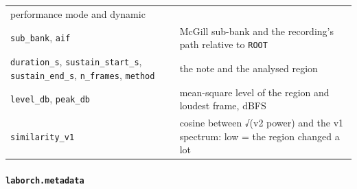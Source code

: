 \documentclass[
  10pt,
]{article}
\begin{document}
\begin{longtable}[]{@{}ll@{}}
\begin{minipage}[t]{0.47\columnwidth}\raggedright
performance mode and dynamic\strut
\end{minipage}\tabularnewline
\begin{minipage}[t]{0.47\columnwidth}\raggedright
\texttt{sub\_bank}, \texttt{aif}\strut
\end{minipage} &
\begin{minipage}[t]{0.47\columnwidth}\raggedright
McGill sub-bank and the recording's path relative to
\texttt{ROOT}\strut
\end{minipage}\tabularnewline
\begin{minipage}[t]{0.47\columnwidth}\raggedright
\texttt{duration\_s}, \texttt{sustain\_start\_s},
\texttt{sustain\_end\_s}, \texttt{n\_frames},
\texttt{method}\strut
\end{minipage} &
\begin{minipage}[t]{0.47\columnwidth}\raggedright
the note and the analysed region\strut
\end{minipage}\tabularnewline
\begin{minipage}[t]{0.47\columnwidth}\raggedright
\texttt{level\_db}, \texttt{peak\_db}\strut
\end{minipage} &
\begin{minipage}[t]{0.47\columnwidth}\raggedright
mean-square level of the region and loudest frame,
dBFS\strut
\end{minipage}\tabularnewline
\begin{minipage}[t]{0.47\columnwidth}\raggedright
\texttt{similarity\_v1}\strut
\end{minipage} &
\begin{minipage}[t]{0.47\columnwidth}\raggedright
cosine between √(v2 power) and the v1 spectrum: low = the
region changed a lot\strut
\end{minipage}\tabularnewline
\bottomrule
\end{longtable}

\paragraph{\texorpdfstring{\texttt{laborch.metadata}}{laborch.metadata}}
\end{document}
